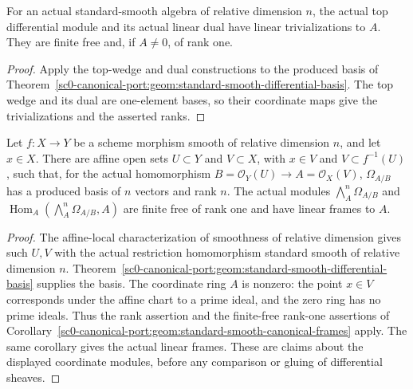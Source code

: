 \begin{corollary}
\label{sc0-canonical-port:geom:standard-smooth-canonical-frames}
\leanok
For an actual standard-smooth algebra of relative dimension
\(n\), the actual top differential module and its actual
linear dual have linear trivializations to \(A\). They are
finite free and, if \(A\ne0\), of rank one.
\end{corollary}
\begin{proof}
Apply the top-wedge and dual constructions to the produced
basis of Theorem~\ref{sc0-canonical-port:geom:standard-smooth-differential-basis}.
The top wedge and its dual are one-element bases, so their
coordinate maps give the trivializations and the asserted ranks.
\end{proof}

\begin{theorem}
\label{sc0-canonical-port:geom:smooth-scheme-chart-frames}
\leanok
Let \(f:X\to Y\) be a scheme morphism smooth of relative
dimension \(n\), and let \(x\in X\). There are affine open
sets \(U\subset Y\) and \(V\subset X\), with \(x\in V\)
and \(V\subset f^{-1}(U)\), such that, for the actual
homomorphism \(B=\mathcal O_Y(U)\to A=\mathcal O_X(V)\),
\(\Omega_{A/B}\) has a produced basis of \(n\) vectors and
rank \(n\). The actual modules
\(\bigwedge_A^n\Omega_{A/B}\) and
\(\operatorname{Hom}_A(\bigwedge_A^n\Omega_{A/B},A)\)
are finite free of rank one and have linear frames to \(A\).
\end{theorem}
\begin{proof}
The affine-local characterization of smoothness of relative
dimension gives such \(U,V\) with the actual restriction
homomorphism standard smooth of relative dimension \(n\).
Theorem~\ref{sc0-canonical-port:geom:standard-smooth-differential-basis} supplies
the basis. The coordinate ring \(A\) is nonzero: the point
\(x\in V\) corresponds under the affine chart to a prime ideal,
and the zero ring has no prime ideals. Thus the rank assertion
and the finite-free rank-one assertions of
Corollary~\ref{sc0-canonical-port:geom:standard-smooth-canonical-frames} apply.
The same corollary gives the actual linear frames. These are
claims about the displayed coordinate modules, before any
comparison or gluing of differential sheaves.
\end{proof}

